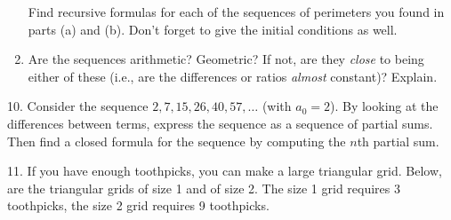 \documentclass[12pt,]{book}
\theoremstyle{plain}
\theoremstyle{definition}
\theoremstyle{definition}
\theoremstyle{definition}
\numberwithin{equation}{chapter}
\newlength{\panelmax}
\begin{document}
\begin{exerciselist}
\begin{enumerate}[label=(\alph*)]
Find recursive formulas for each of the sequences of perimeters you found in parts (a) and (b). Don't forget to give the initial conditions as well. %
\item\hypertarget{li-124}{}\hypertarget{p-210}{}%
Are the sequences arithmetic? Geometric? If not, are they \emph{close} to being either of these (i.e., are the differences or ratios \emph{almost} constant)? Explain. %
\end{enumerate}
%
\par\smallskip
\item[10.]\hypertarget{exercise-19}{}\hypertarget{p-211}{}%
Consider the sequence \(2, 7, 15, 26, 40, 57, \ldots\) (with \(a_0 = 2\)). By looking at the differences between terms, express the sequence as a sequence of partial sums. Then find a closed formula for the sequence by computing the \(n\)th partial sum.%
\par\smallskip
\item[11.]\hypertarget{exercise-20}{}\hypertarget{p-213}{}%
If you have enough toothpicks, you can make a large triangular grid. Below, are the triangular grids of size 1 and of size 2. The size 1 grid requires 3 toothpicks, the size 2 grid requires 9 toothpicks.%
{%
\setlength{\panelmax}{0pt}
\ifdefined\panelboxAimage\else\newsavebox{\panelboxAimage}\fi%
\begin{lrbox}{\panelboxAimage}
\end{lrbox}
\ifdefined\phAimage\else\newlength{\phAimage}\fi%
\setlength{\phAimage}{\ht\panelboxAimage+\dp\panelboxAimage}
\settototalheight{\phAimage}{\usebox{\panelboxAimage}}
\setlength{\panelmax}{\maxof{\panelmax}{\phAimage}}
\ifdefined\panelboxBimage\else\newsavebox{\panelboxBimage}\fi%
\begin{lrbox}{\panelboxBimage}
\end{lrbox}}
\end{exerciselist}
\end{document}
